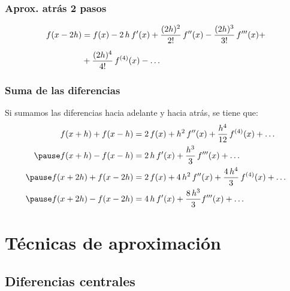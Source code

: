 \documentclass[12pt]{beamer}
\begin{document}
\begin{frame}
\frametitle{Aprox. atrás 2 pasos}
\begin{eqnarray*}
\begin{aligned}
f( x - 2 h) &= f(x) - 2 \, h \, {f}^{\prime} (x) + \dfrac{(2 h)^{2}}{2!} \, {f}^{\prime \prime} (x) - \dfrac{(2 h)^{3}}{3!} \, {f}^{\prime \prime \prime} (x) + \\[0.5em]
&+  \dfrac{(2 h)^{4}}{4!} \, f^{(4)}(x) - \ldots
\end{aligned}
\end{eqnarray*}
\end{frame}
\begin{frame}
\frametitle{Suma de las diferencias}
Si sumamos las diferencias hacia adelante y hacia atrás, se tiene que:
\pause
\begin{eqnarray*}
\begin{aligned}
f (x + h) + f (x - h) &= 2 \, f (x) + h^{2} \, \sderivada{f} (x) + \dfrac{h^{4}}{12} \, f^{(4)}(x) + \ldots \\ \pause
f (x + h) - f (x - h) &= 2 \, h \, \pderivada{f} (x) + \dfrac{h^{3}}{3} \, \tderivada{f} (x) + \ldots \\ \pause
f (x + 2 h) + f ( x - 2 h) &= 2 \, f (x) + 4 \, h^{2} \, \sderivada{f} (x) + \dfrac{4 \, h^{4}}{3} \, f^{(4)} (x) +\ldots \\ \pause
f (x + 2 h) - f (x - 2 h) &= 4 \, h \, \pderivada{f} (x) + \dfrac{8 \, h^{3}}{3} \tderivada{f} (x) + \ldots
\end{aligned}
\end{eqnarray*}
\end{frame}

\section{Técnicas de aproximación}
\subsection{Diferencias centrales}
\end{document}
